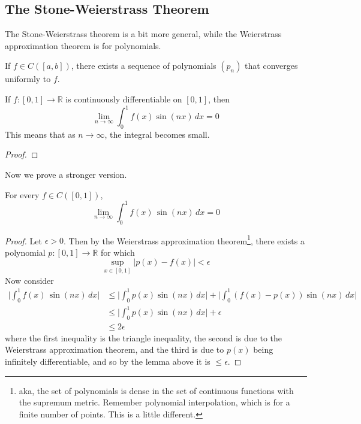 \subsection{The Stone-Weierstrass Theorem} 

  The Stone-Weierstrass theorem is a bit more general, while the Weierstrass approximation theorem is for polynomials. 

  \begin{theorem}
    If $f \in C([a, b])$, there exists a sequence of polynomials $(p_n)$ that converges uniformly to $f$. 
  \end{theorem}

  \begin{lemma} 
    If $f: [0, 1] \to \mathbb{R}$ is continuously differentiable on $[0, 1]$, then 
    \begin{equation}
      \lim_{n \to \infty} \int_0^1 f(x) \sin(nx) \,dx = 0
    \end{equation} 
    This means that as $n \to \infty$, the integral becomes small. 
  \end{lemma}
  \begin{proof}
    
  \end{proof}

  Now we prove a stronger version. 

  \begin{theorem}
    For every $f \in C([0, 1])$, 
    \begin{equation}
      \lim_{n \to \infty} \int_0^1 f(x)\, \sin(nx) \,dx = 0
    \end{equation}
  \end{theorem}
  \begin{proof}
    Let $\epsilon > 0$. Then by the Weierstrass approximation theorem\footnote{aka, the set of polynomials is dense in the set of continuous functions with the supremum metric. Remember polynomial interpolation, which is for a finite number of points. This is a little different.}, there exists a polynomial $p: [0, 1] \to \mathbb{R}$ for which 
    \begin{equation}
      \sup_{x \in [0, 1]} | p(x) - f(x)| < \epsilon 
    \end{equation}
    Now consider 
    \begin{align}
      \bigg| \int_0^1 f(x) \, \sin(nx) \,dx \bigg| & \leq \bigg| \int_0^1 p(x) \sin(nx) \,dx \bigg| + \bigg| \int_0^1 (f(x) - p(x)) \sin(nx) \,dx \bigg| \\
                                                   & \leq \bigg| \int_0^1 p(x) \sin(nx) \,dx \bigg| + \epsilon \\
                                                   & \leq 2 \epsilon 
    \end{align}
    where the first inequality is the triangle inequality, the second is due to the Weierstrass approximation theorem, and the third is due to $p(x)$ being infinitely differentiable, and so by the lemma above it is $\leq \epsilon$. 

  \end{proof}

